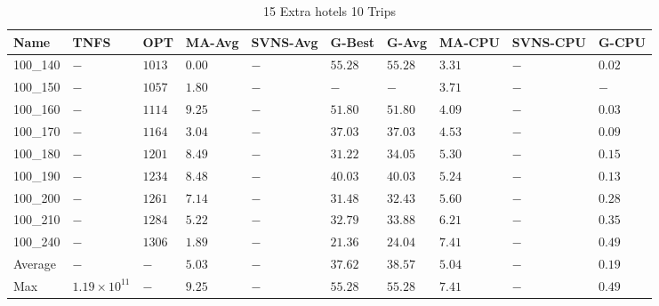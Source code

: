 \begin{center}
\begin{table}[]
\centering
\begin{tabular}{|lll|l|l|ll|lll|}
\hline
Name     & TNFS                & OPT    & MA-Avg & SVNS-Avg & G-Best & G-Avg & MA-CPU  & SVNS-CPU & G-CPU \\
\hline
100\_140  & $-                $ & $1013$ & $\bm{0.00}$ & $-$      & $55.28$& $55.28$   & $3.31$  & $-$      & $0.02$ \\
100\_150  & $-                $ & $1057$ & $1.80$ & $-$      & $-    $& $-    $   & $3.71$  & $-$      & $-   $ \\
100\_160  & $-                $ & $1114$ & $9.25$ & $-$      & $51.80$& $51.80$   & $4.09$  & $-$      & $0.03$ \\
100\_170  & $-                $ & $1164$ & $3.04$ & $-$      & $37.03$& $37.03$   & $4.53$  & $-$      & $0.09$ \\
100\_180  & $-                $ & $1201$ & $8.49$ & $-$      & $31.22$& $34.05$   & $5.30$  & $-$      & $0.15$ \\
100\_190  & $-                $ & $1234$ & $8.48$ & $-$      & $40.03$& $40.03$   & $5.24$  & $-$      & $0.13$ \\
100\_200  & $-                $ & $1261$ & $7.14$ & $-$      & $31.48$& $32.43$   & $5.60$  & $-$      & $0.28$ \\
100\_210  & $-                $ & $1284$ & $5.22$ & $-$      & $32.79$& $33.88$   & $6.21$  & $-$      & $0.35$ \\
100\_240  & $-                $ & $1306$ & $1.89$ & $-$      & $21.36$& $24.04$   & $7.41$  & $-$      & $0.49$ \\
\hline
Average  & $-                $ & $-   $ & $5.03$ & $-$      & $37.62$& $38.57$   & $5.04$  & $-$      & $0.19$ \\
Max      & $1.19\times10^{11}$ & $-   $ & $9.25$ & $-$      & $55.28$& $55.28$   & $7.41$  & $-$      & $0.49$ \\
\hline
\end{tabular}
\caption{15 Extra hotels 10 Trips}
\label{15-10}
\end{table}
\end{center}
